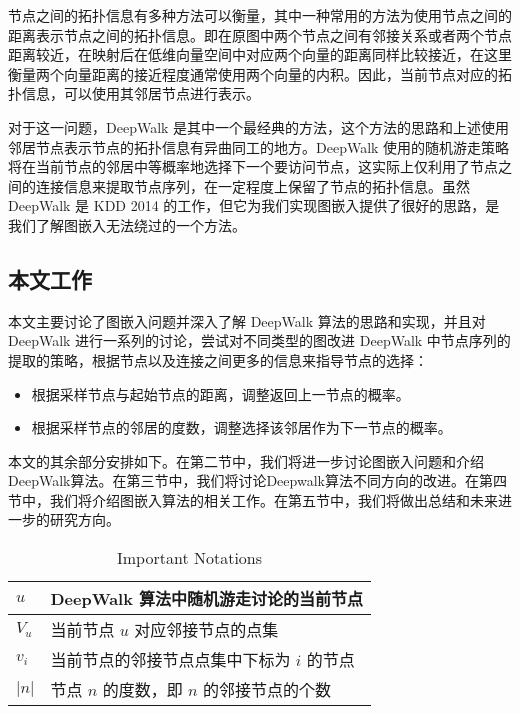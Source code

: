 \documentclass{ctexart}
\begin{document}
节点之间的拓扑信息有多种方法可以衡量，其中一种常用的方法为使用节点之间的距离表示节点之间的拓扑信息。即在原图中两个节点之间有邻接关系或者两个节点距离较近，在映射后在低维向量空间中对应两个向量的距离同样比较接近，在这里衡量两个向量距离的接近程度通常使用两个向量的内积。因此，当前节点对应的拓扑信息，可以使用其邻居节点进行表示。


对于这一问题，DeepWalk 是其中一个最经典的方法，这个方法的思路和上述使用邻居节点表示节点的拓扑信息有异曲同工的地方。DeepWalk 使用的随机游走策略将在当前节点的邻居中等概率地选择下一个要访问节点，这实际上仅利用了节点之间的连接信息来提取节点序列，在一定程度上保留了节点的拓扑信息。虽然 DeepWalk\cite{perozzi2014deepwalk} 是 KDD 2014 的工作，但它为我们实现图嵌入提供了很好的思路，是我们了解图嵌入无法绕过的一个方法。

\subsection{本文工作}

本文主要讨论了图嵌入问题并深入了解 DeepWalk 算法的思路和实现，并且对 DeepWalk 进行一系列的讨论，尝试对不同类型的图改进 DeepWalk 中节点序列的提取的策略，根据节点以及连接之间更多的信息来指导节点的选择：

\begin{itemize}
    \item 根据采样节点与起始节点的距离，调整返回上一节点的概率。
    \item 根据采样节点的邻居的度数，调整选择该邻居作为下一节点的概率。
\end{itemize}

本文的其余部分安排如下。在第二节中，我们将进一步讨论图嵌入问题和介绍DeepWalk算法。在第三节中，我们将讨论Deepwalk算法不同方向的改进。在第四节中，我们将介绍图嵌入算法的相关工作。在第五节中，我们将做出总结和未来进一步的研究方向。

\begin{table}[!t]
\renewcommand{\arraystretch}{1.1}
\caption{Important Notations}
\label{notations}
\centering
\begin{tabular}{|l|p{}|}
    \hline
    \(u\) & DeepWalk 算法中随机游走讨论的当前节点 \\
    \hline
    \(V_u\) & 当前节点 \(u\) 对应邻接节点的点集 \\
    \hline
    \(v_i\) & 当前节点的邻接节点点集中下标为 \(i\) 的节点 \\
    \hline
    \(|n|\) & 节点 \(n\) 的度数，即 \(n\) 的邻接节点的个数 \\
    \hline
\end{tabular}
\end{table}
\end{document}
